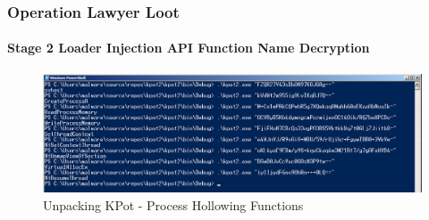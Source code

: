 \documentclass[aspectratio=169]{beamer}
\begin{document}
{
\begin{frame}
  \frametitle{Operation Lawyer Loot}
  \framesubtitle{Stage 2 Loader Injection API Function Name Decryption}
  \begin{center}
    \begin{figure}
      \includegraphics[width=14cm]{kpot-unpacking-10}
      \caption{Unpacking KPot - Process Hollowing Functions}
    \end{figure}
  \end{center}
\end{frame}
}
\end{document}
